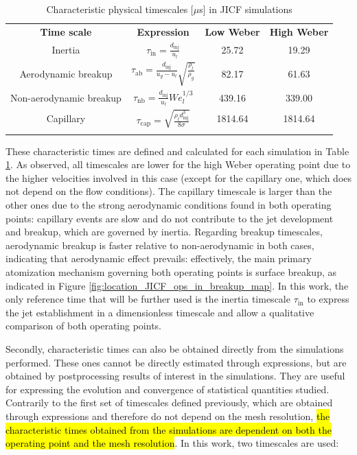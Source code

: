 \begin{table}[!h]
\centering
\caption{Characteristic physical timescales [$\mu$s] in JICF simulations}
\begin{tabular}{cccc}
\thickhline
\textbf{Time scale} & \textbf{Expression} & \textbf{Low Weber} & \textbf{High Weber} \\
\thickhline
Inertia & $\tau_\mathrm{in} = \frac{d_\mathrm{inj}}{u_l}$ & 25.72 & 19.29 \\
Aerodynamic breakup  &  $\tau_\mathrm{ab} =  \frac{d_\mathrm{inj}}{u_g - u_l} \sqrt{\frac{\rho_l}{\rho_g}} $ & 82.17 & 61.63 \\
Non-aerodynamic breakup  &  $\tau_\mathrm{nb} = \frac{d_\mathrm{inj}}{u_l} We_l^{1/3} $ &  439.16 & 339.00 \\
Capillary & $\tau_\mathrm{cap} = \sqrt{\frac{\rho_l d_\mathrm{inj}^3}{8 \sigma}}$ & 1814.64 & 1814.64 \\
\thickhline
\end{tabular}
\label{tab:jicf_characteristic times}
\end{table}


These characteristic times are defined and calculated for each simulation in Table \ref{tab:jicf_characteristic times}. As observed, all timescales are lower for the high Weber operating point due to the higher velocities involved in this case (except for the capillary one, which does not depend on the flow conditions). The capillary timescale is larger than the other ones due to the strong aerodynamic conditions found in both operating points: capillary events are slow and do not contribute to the jet development and breakup, which are governed by inertia. Regarding breakup timescales, aerodynamic breakup is faster relative to non-aerodynamic in both cases, indicating that aerodynamic effect prevails: effectively, the main primary atomization mechanism governing both operating points is surface breakup, as indicated in Figure \ref{fig:location_JICF_ops_in_breakup_map}. In this work, the only reference time that will be further used is the inertia timescale $\tau_\mathrm{in}$ to express the jet establishment in a dimensionless timescale and allow a qualitative comparison of both operating points. 

Secondly, characteristic times can also be obtained directly from the simulations performed. These ones cannot be directly estimated through expressions, but are obtained by postprocessing results of interest in the simulations. They are useful for expressing the evolution and convergence of statistical quantities studied. Contrarily to the first set of timescales defined previously, which are obtained through expressions and therefore do not depend on the mesh resolution, \hl{the characteristic times obtained from the simulations are dependent on both the operating point and the mesh resolution}. In this work, two timescales are used: 


